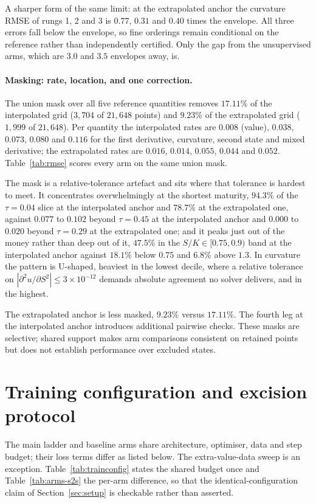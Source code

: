 \documentclass{article}
\begin{document}
A sharper form of the same limit: at the extrapolated anchor the curvature RMSE of
rungs 1, 2 and 3 is $0.77$, $0.31$ and $0.40$ times the envelope. All three errors fall below the envelope, so fine orderings remain conditional
on the reference rather than independently certified. Only the gap from the unsupervised arms, which are $3.0$ and $3.5$ envelopes
away, is.

\paragraph{Masking: rate, location, and one correction.} The union mask over all
five reference quantities removes $17.11\%$ of the interpolated grid
($3{,}704$ of $21{,}648$ points) and $9.23\%$ of the extrapolated grid
($1{,}999$ of $21{,}648$). Per quantity the interpolated rates are $0.008$ (value),
$0.038$, $0.073$, $0.080$ and $0.116$ for the first derivative, curvature, second
state and mixed derivative; the extrapolated rates are $0.016$, $0.014$, $0.055$,
$0.044$ and $0.052$. Table~\ref{tab:rmse} scores every arm on the same union mask.

The mask is a relative-tolerance artefact and sits where that tolerance is hardest
to meet. It concentrates overwhelmingly at the shortest maturity, $94.3\%$ of the
$\tau = 0.04$ slice at the interpolated anchor and $78.7\%$ at the extrapolated one,
against $0.077$ to $0.102$ beyond $\tau = 0.45$ at the interpolated anchor and
$0.000$ to $0.020$ beyond $\tau = 0.29$ at the extrapolated one; and it peaks just out
of the money rather than deep out of it, $47.5\%$ in the $S/K \in [0.75, 0.9)$ band
at the interpolated anchor against $18.1\%$ below $0.75$ and $6.8\%$ above $1.3$. In
curvature the pattern is U-shaped, heaviest in the lowest decile, where a relative
tolerance on $|\partial^{2}u/\partial S^{2}| \le 3\times10^{-12}$ demands absolute
agreement no solver delivers, and in the highest.

The extrapolated anchor is less masked, $9.23\%$ versus $17.11\%$. The fourth
leg at the interpolated anchor introduces additional pairwise checks. These masks
are selective; shared support makes arm comparisons consistent on retained points
but does not establish performance over excluded states.

\section{Training configuration and excision protocol}
\label{app:config}
The main ladder and baseline arms share architecture, optimiser, data and step
budget; their loss terms differ as listed below. The extra-value-data sweep is an
exception. Table~\ref{tab:trainconfig} states the shared
budget once and Table~\ref{tab:arms-s2s} the per-arm difference, so that the
identical-configuration claim of Section~\ref{sec:setup} is checkable rather than
asserted.
\end{document}
